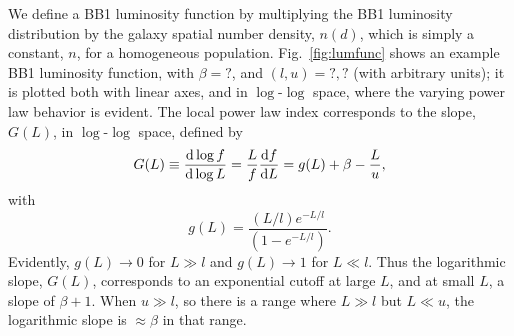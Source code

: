 We define a BB1 luminosity function by multiplying the BB1 luminosity distribution by the galaxy spatial number density, $n(d)$, which is simply a constant, $n$, for a homogeneous population.
Fig.~\ref{fig:lumfunc} shows an example BB1 luminosity function, with $\beta = ?$, and $(l,u) = ?, ?$ (with arbitrary units); it is plotted both with linear axes, and in $\log$-$\log$ space, where the varying power law behavior is evident.
The local power law index corresponds to the slope, $G(L)$, in $\log$-$\log$ space, defined by
\begin{equation}
	G(L) \equiv \frac{\textrm{d}\log{f}}{\textrm{d}\log{L}} = \frac{L}{f} \frac{\textrm{d} f}{\textrm{d} L} = g(L) + \beta - \frac{L}{u},
\end{equation}
with
\begin{equation}
	g(L) = \frac{(L/l) e^{-L/l}}{\left(1 - e^{-L/l}\right)}.
\end{equation}
Evidently, $g(L) \rightarrow 0$ for $L \gg l$ and $g(L) \rightarrow 1$ for $L \ll l$.
Thus the logarithmic slope, $G(L)$, corresponds to an exponential cutoff at large $L$, and at small $L$, a slope of $\beta + 1$.
When $u\gg l$, so there is a range where $L\gg l$ but $L\ll u$, the logarithmic slope is $\approx \beta$ in that range.


